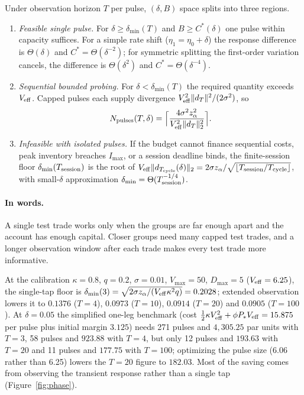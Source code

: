 \begin{proposition}\label{prop:tri}
Under observation horizon $T$ per pulse, $(\delta,B)$ space splits into three regions.
\begin{enumerate}[label=(\roman*)]
\item \emph{Feasible single pulse.} For $\delta\ge\delta_{\min}(T)$ and $B\ge C^*(\delta)$ one pulse within capacity suffices. For a simple rate shift ($\eta_1=\eta_0+\delta$) the response difference is $\Theta(\delta)$ and $C^*=\Theta(\delta^{-2})$; for symmetric splitting the first-order variation cancels, the difference is $\Theta(\delta^2)$ and $C^*=\Theta(\delta^{-4})$.
\item \emph{Sequential bounded probing.} For $\delta<\delta_{\min}(T)$ the required quantity exceeds $V_{\rm eff}$. Capped pulses each supply divergence $V_{\rm eff}^2\|d_T\|^2/(2\sigma^2)$, so
\begin{equation}\label{eq:npulses}
N_{\rm pulses}(T,\delta)=\Bigl\lceil\frac{4\sigma^2z_\alpha^2}{V_{\rm eff}^2\|d_T\|_2^2}\Bigr\rceil .
\end{equation}
\item \emph{Infeasible with isolated pulses.} If the budget cannot finance sequential costs, peak inventory breaches $I_{\max}$, or a session deadline binds, the finite-session floor $\delta_{\min}(T_{\rm session})$ is the root of $V_{\rm eff}\|d_{T_{\rm cycle}}(\delta)\|_2=2\sigma z_\alpha/\sqrt{\lfloor T_{\rm session}/T_{\rm cycle}\rfloor}$, with small-$\delta$ approximation $\delta_{\min}=\Theta(T_{\rm session}^{-1/4})$.
\end{enumerate}
\end{proposition}

\paragraph{In words.} A single test trade works only when the groups are far enough apart and the account has enough capital. Closer groups need many capped test trades, and a longer observation window after each trade makes every test trade more informative.

At the calibration $\kappa=0.8$, $q=0.2$, $\sigma=0.01$, $V_{\max}=50$, $D_{\max}=5$ ($V_{\rm eff}=6.25$), the single-tap floor is $\delta_{\min}(3)=\sqrt{2\sigma z_\alpha/(V_{\rm eff}\kappa^2q)}=0.2028$; extended observation lowers it to $0.1376$ ($T=4$), $0.0973$ ($T=10$), $0.0914$ ($T=20$) and $0.0905$ ($T=100$). At $\delta=0.05$ the simplified one-leg benchmark (cost $\tfrac12\kappa V_{\rm eff}^2+\phi P_*V_{\rm eff}=15.875$ per pulse plus initial margin $3.125$) needs 271 pulses and $4{,}305.25$ par units with $T=3$, 58 pulses and $923.88$ with $T=4$, but only 12 pulses and $193.63$ with $T=20$ and 11 pulses and $177.75$ with $T=100$; optimizing the pulse size (6.06 rather than 6.25) lowers the $T=20$ figure to $182.03$. Most of the saving comes from observing the transient response rather than a single tap (Figure~\ref{fig:phase}).


